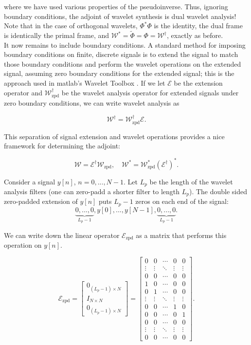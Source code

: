 \documentclass[journal]{IEEEtran}
\begin{document}
\noindent where we have used various properties of the pseudoinverse.  Thus, ignoring boundary conditions, the adjoint of wavelet synthesis is dual wavelet analysis!  Note that in the case of orthogonal wavelets, $\Phi^\ast\Phi$ is the identity, the dual frame is identically the primal frame, and ${\mathcal{W}^\ast = \tilde{\Phi}=\Phi=\mathcal{W}^\dagger}$, exactly as before.\\

It now remains to include boundary conditions.  A standard method for imposing boundary conditions on finite, discrete signals is to extend the signal to match those boundary conditions and perform the wavelet operations on the extended signal, assuming zero boundary conditions for the extended signal; this is the approach used in {\sc matlab}'s Wavelet Toolbox \cite{matlab_wt_2015}.  If we let $\mathcal{E}$ be the extension operator and $\mathcal{W}^\dagger_\text{zpd}$ be the wavelet analysis operator for extended signals under zero boundary conditions, we can write wavelet analysis as 

\[ \mathcal{W}^\dagger = \mathcal{W}^\dagger_\text{zpd}\mathcal{E}. \] 

\noindent This separation of signal extension and wavelet operations provides a nice framework for determining the adjoint:

\[ \mathcal{W} = \mathcal{E}^\dagger\mathcal{W}_\text{zpd}, \quad \mathcal{W}^\ast = \mathcal{W}^\ast_\text{zpd}(\mathcal{E}^\dagger)^\ast. \] 

Consider a signal $y[n]$, $n=0,...,N-1$.  Let $L_p$ be the length of the wavelet analysis filters (one can zero-padd a shorter filter to length $L_p$).  The double sided zero-padded extension of $y[n]$ puts $L_p-1$ zeros on each end of the signal:
\[ \underbrace{0, ..., 0}_{L_p-1}, y[0], ..., y[N-1], \underbrace{0, ..., 0}_{L_p-1}. \]

\noindent We can write down the linear operator $\mathcal{E}_\text{zpd}$ as a matrix that performs this operation on $y[n]$.

\[ \mathcal{E}_\text{zpd} = \begin{bmatrix} 0_{(L_p-1)\times N}\\ I_{N\times N}\\ 0_{(L_p-1)\times N}\end{bmatrix} = \begin{bmatrix} 0 & 0 & \cdots & 0 & 0\\ \vdots & \vdots &\ddots & \vdots & \vdots\\ 0 & 0 & \cdots & 0 & 0\\[0.5em] 1 & 0 & \cdots & 0 & 0\\ 0 & 1 & \cdots & 0 & 0\\ \vdots & \vdots & \ddots & \vdots & \vdots\\ 0 & 0 & \cdots & 1 & 0\\ 0 & 0 & \cdots & 0 & 1\\[0.5em] 0 & 0 & \cdots & 0 & 0\\ \vdots & \vdots & \ddots & \vdots & \vdots\\ 0 & 0 & \cdots & 0 & 0\end{bmatrix}. \] 
\end{document}
